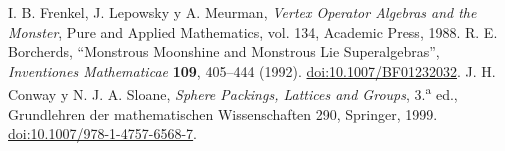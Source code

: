  I. B. Frenkel, J. Lepowsky y A. Meurman, \emph{Vertex Operator Algebras and the Monster}, Pure and Applied Mathematics, vol. 134, Academic Press, 1988.
 R. E. Borcherds, ``Monstrous Moonshine and Monstrous Lie Superalgebras'', \emph{Inventiones Mathematicae} \textbf{109}, 405--444 (1992). \href{https://doi.org/10.1007/BF01232032}{doi:10.1007/BF01232032}.
 J. H. Conway y N. J. A. Sloane, \emph{Sphere Packings, Lattices and Groups}, 3.\textsuperscript{a} ed., Grundlehren der mathematischen Wissenschaften 290, Springer, 1999. \href{https://doi.org/10.1007/978-1-4757-6568-7}{doi:10.1007/978-1-4757-6568-7}.

